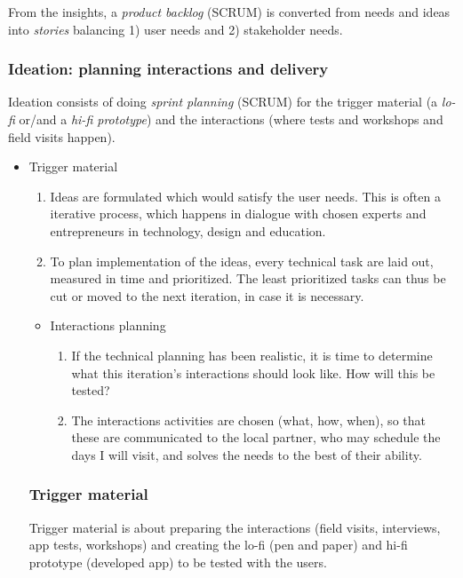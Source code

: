     From the insights, a \textit{product backlog} (SCRUM) is converted from needs and ideas into \textit{stories} balancing 1) user needs and 2) stakeholder needs.

\subsubsection{Ideation: planning interactions and delivery}
  Ideation consists of doing \textit{sprint planning} (SCRUM) for the trigger material (a \textit{lo-fi} or/and a \textit{hi-fi prototype}) and the interactions (where tests and workshops and field visits happen).

    \begin{itemize}
    \item Trigger material
    \begin{enumerate}
    \item Ideas are formulated which would satisfy the user needs. This is often a iterative process, which happens in dialogue with chosen experts and entrepreneurs in technology, design and education.
    \item To plan implementation of the ideas, every technical task are laid out, measured in time and prioritized. The least prioritized tasks can thus be cut or moved to the next iteration, in case it is necessary.
    \end{enumerate}
    \begin{itemize}
    \item Interactions planning
    \begin{enumerate}
    \item If the technical planning has been realistic, it is time to determine what this iteration's interactions should look like. How will this be tested?
    \item The interactions activities are chosen (what, how, when), so that these are communicated to the local partner, who may schedule the days I will visit, and solves the needs to the best of their ability.
    \end{enumerate}
    \end{itemize}

  \subsubsection{Trigger material}
  Trigger material is about preparing the interactions (field visits, interviews, app tests, workshops) and creating the lo-fi (pen and paper) and hi-fi prototype (developed app) to be tested with the users.


\end{itemize}
